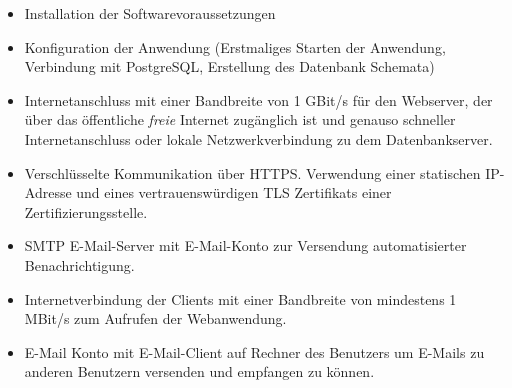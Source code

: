 \begin{itemize}
	\item Installation der Softwarevoraussetzungen

	\item Konfiguration der Anwendung (Erstmaliges Starten der Anwendung, Verbindung mit PostgreSQL, Erstellung des Datenbank Schemata)

	\item Internetanschluss mit einer Bandbreite von 1 GBit/s für den Webserver, der über das öffentliche \emph{freie} Internet zugänglich ist und genauso schneller Internetanschluss oder lokale Netzwerkverbindung zu dem Datenbankserver.

	\item Verschlüsselte Kommunikation über HTTPS. Verwendung einer statischen IP-Adresse und eines vertrauenswürdigen TLS Zertifikats einer Zertifizierungsstelle.

	\item SMTP E-Mail-Server mit E-Mail-Konto zur Versendung automatisierter Benachrichtigung.

	\item Internetverbindung der Clients mit einer Bandbreite von mindestens 1 MBit/s zum Aufrufen der Webanwendung.

	\item E-Mail Konto mit E-Mail-Client auf Rechner des Benutzers um E-Mails zu anderen Benutzern versenden und empfangen zu können.
\end{itemize}

